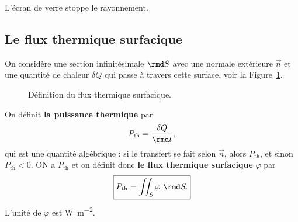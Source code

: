         \begin{example}
            L'écran de verre stoppe le rayonnement.
        \end{example}
    
    \subsection{Le flux thermique surfacique}

        On considère une section infinitésimale $\rmd S$ avec une normale extérieure $\vec{n}$ et une quantité de chaleur $\delta Q$ qui passe à travers cette surface, voir la Figure~\ref{fig:flux_thermique_surfacique_section}.

        \begin{figure}
            \centering
            \caption{Définition du flux thermique surfacique.}    
            \label{fig:flux_thermique_surfacique_section}
        \end{figure}

        \begin{definition}
            On définit \textbf{la puissance thermique} par 
            \begin{equation*}
                P_{\text{th}}=\frac{\delta Q}{\rmd t},    
            \end{equation*}
            qui est une quantité algébrique : si le transfert se fait selon $\vec{n}$, alors $P_{\text{th}}$, et sinon $P_{\text{th}}<0$. ON a $P_{\text{th}}$ et on définit donc \textbf{le flux thermique surfacique} $\varphi$ par
            \begin{equation*}
                \boxed{
                    P_{\text{th}}=\iint_{S}\varphi~\rmd S.
                }
            \end{equation*} 
            L'unité de $\varphi$ est \si{\watt\per\metre\squared}.
        \end{definition}

